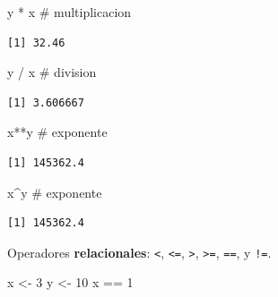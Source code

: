 \documentclass[
  letterpaper,
  DIV=11,
  numbers=noendperiod]{scrartcl}
\newenvironment{Shaded}{\begin{snugshade}}{\end{snugshade}}
\newcommand{\CommentTok}[1]{\textcolor[rgb]{0.37,0.37,0.37}{#1}}
\newcommand{\DecValTok}[1]{\textcolor[rgb]{0.68,0.00,0.00}{#1}}
\newcommand{\NormalTok}[1]{\textcolor[rgb]{0.00,0.23,0.31}{#1}}
\newcommand{\OtherTok}[1]{\textcolor[rgb]{0.00,0.23,0.31}{#1}}
\newcommand{\SpecialCharTok}[1]{\textcolor[rgb]{0.37,0.37,0.37}{#1}}
\begin{document}
\begin{Shaded}
\begin{Highlighting}[]
\NormalTok{y }\SpecialCharTok{*}\NormalTok{ x }\CommentTok{\# multiplicacion }
\end{Highlighting}
\end{Shaded}

\begin{verbatim}
[1] 32.46
\end{verbatim}

\begin{Shaded}
\begin{Highlighting}[]
\NormalTok{y }\SpecialCharTok{/}\NormalTok{ x }\CommentTok{\# division }
\end{Highlighting}
\end{Shaded}

\begin{verbatim}
[1] 3.606667
\end{verbatim}

\begin{Shaded}
\begin{Highlighting}[]
\NormalTok{x}\SpecialCharTok{**}\NormalTok{y }\CommentTok{\# exponente }
\end{Highlighting}
\end{Shaded}

\begin{verbatim}
[1] 145362.4
\end{verbatim}

\begin{Shaded}
\begin{Highlighting}[]
\NormalTok{x}\SpecialCharTok{\^{}}\NormalTok{y }\CommentTok{\# exponente}
\end{Highlighting}
\end{Shaded}

\begin{verbatim}
[1] 145362.4
\end{verbatim}

Operadores \textbf{relacionales}: \texttt{\textless{}},
\texttt{\textless{}=}, \texttt{\textgreater{}},
\texttt{\textgreater{}=}, \texttt{==}, y \texttt{!=}.

\begin{Shaded}
\begin{Highlighting}[]
\NormalTok{x }\OtherTok{\textless{}{-}} \DecValTok{3} 
\NormalTok{y }\OtherTok{\textless{}{-}} \DecValTok{10} 
\NormalTok{x }\SpecialCharTok{==} \DecValTok{1} 
\end{Highlighting}
\end{Shaded}
\end{document}
